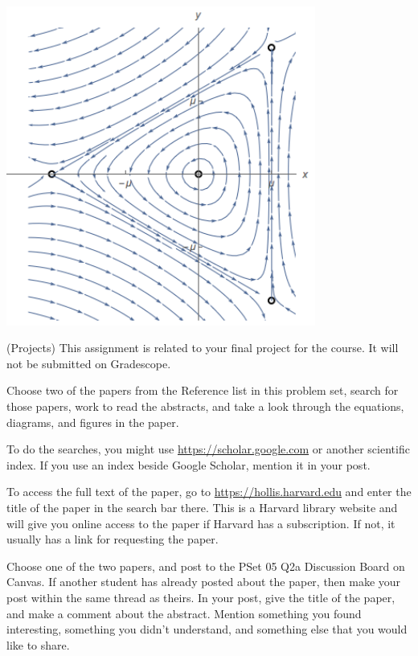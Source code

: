 \documentclass[12pt,letterpaper,answers]{exam}
\begin{document}
\begin{questions}
\begin{parts}
\begin{solution}
\includegraphics[width=4in]{img/S19pset05p2.png}

\end{solution}

\end{parts}

\question (Projects) This assignment is related to your final project for the course.  It will not be submitted on Gradescope.
\begin{parts}
    \item Choose two of the papers from the Reference list in this problem set, search for those papers, work to read the abstracts, and take a look through the equations, diagrams, and figures in the paper.  
    
    To do the searches, you might use \url{https://scholar.google.com} or another scientific index.  If you use an index beside Google Scholar, mention it in your post.

To access the full text of the paper, go to \url{https://hollis.harvard.edu} and enter the title of the paper in the search bar there.  This is a Harvard library website and will give you online access to the paper if Harvard has a subscription.  If not, it usually has a link for requesting the paper.


Choose one of the two papers, and post to the PSet 05 Q2a Discussion Board on Canvas.  If another student has already posted about the paper, then make your post within the same thread as theirs.  In your post, give the title of the paper, and make a comment about the abstract.  Mention something you found interesting, something you didn't understand, and something else that you would like to share.


\end{parts}
\end{questions}
\end{document}
